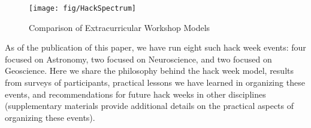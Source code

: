 \begin{figure}
\begin{center}
\texttt{[image: fig/HackSpectrum]}
\caption{Comparison of Extracurricular Workshop Models}
\label{fig:hackspectrum}
\end{center}
\end{figure}

As of the publication of this paper, we have run eight such hack week events: four focused on Astronomy, two focused on Neuroscience, and two focused on Geoscience.
Here we share the philosophy behind the hack week model, results from surveys of participants, practical lessons we have learned in organizing these events, and recommendations for future hack weeks in other disciplines (supplementary materials provide additional details on the practical aspects of organizing these events).
